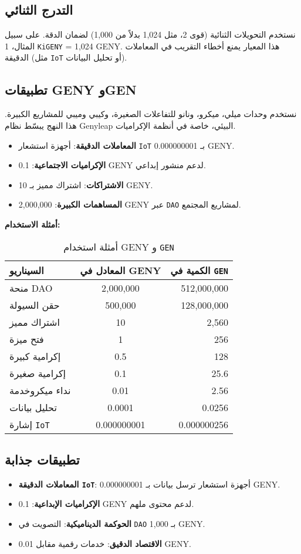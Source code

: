 \documentclass[a4paper,12pt,openany]{book}
\begin{document}
\subsection*{التدرج الثنائي}
نستخدم التحويلات الثنائية (قوى 2، مثل 1,024 بدلاً من 1,000) لضمان الدقة. على سبيل المثال، 1 \texttt{KiGENY} = 1,024 GENY. هذا المعيار يمنع أخطاء التقريب في المعاملات الدقيقة (مثل \texttt{IoT} أو تحليل البيانات).

\subsection*{تطبيقات GENY وGEN}
نستخدم وحدات ميلي، ميكرو، ونانو للتفاعلات الصغيرة، وكيبي وميبي للمشاريع الكبيرة. هذا النهج يبسّط نظام Genyleap البيئي، خاصة في أنظمة الإكراميات.
\begin{itemize}
    \item \textbf{المعاملات الدقيقة}: أجهزة استشعار \texttt{IoT} بـ 0.000000001 GENY.
    \item \textbf{الإكراميات الاجتماعية}: 0.1 GENY لدعم منشور إبداعي.
    \item \textbf{الاشتراكات}: اشتراك مميز بـ 10 GENY.
    \item \textbf{المساهمات الكبيرة}: 2,000,000 GENY عبر \texttt{DAO} لمشاريع المجتمع.
\end{itemize}

\textbf{أمثلة الاستخدام:}
\begin{table}[h]
\centering
\caption{أمثلة استخدام GENY و \texttt{GEN}}
\small
\begin{tabular}{l c r}
\hline
\textbf{السيناريو} & \textbf{المعادل في GENY} & \textbf{الكمية في \texttt{GEN}} \\
\hline
منحة DAO & 2,000,000 & 512,000,000 \\
حقن السيولة & 500,000 & 128,000,000 \\
اشتراك مميز & 10 & 2,560 \\
فتح ميزة & 1 & 256 \\
إكرامية كبيرة & 0.5 & 128 \\
إكرامية صغيرة & 0.1 & 25.6 \\
نداء ميكروخدمة & 0.01 & 2.56 \\
تحليل بيانات & 0.0001 & 0.0256 \\
إشارة \texttt{IoT} & 0.000000001 & 0.000000256 \\
\hline
\end{tabular}
\end{table}

\subsection*{تطبيقات جذابة}
\begin{itemize}
    \item \textbf{المعاملات الدقيقة \texttt{IoT}}: أجهزة استشعار ترسل بيانات بـ 0.000000001 GENY.
    \item \textbf{الإكراميات الإبداعية}: 0.1 GENY لدعم محتوى ملهم.
    \item \textbf{الحوكمة الديناميكية}: التصويت في \texttt{DAO} بـ 1,000 GENY.
    \item \textbf{الاقتصاد الدقيق}: خدمات رقمية مقابل 0.01 GENY.
\end{itemize}
\end{document}

